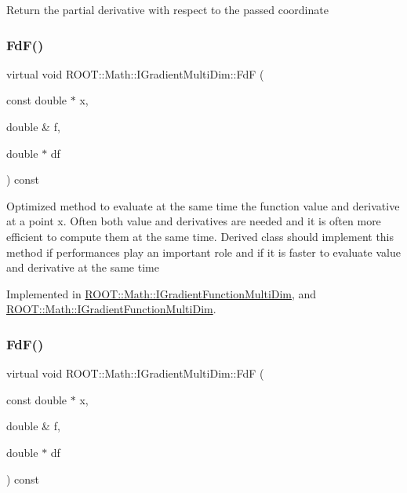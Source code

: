 Return the partial derivative with respect to the passed coordinate \mbox{\label{classROOT_1_1Math_1_1IGradientMultiDim_ad8d0e31b786327014524483a708d8f82}} 
\subsubsection{\texorpdfstring{FdF()}{FdF()}\hspace{0.1cm}{\footnotesize\ttfamily [1/2]}}
{\footnotesize\ttfamily virtual void R\+O\+O\+T\+::\+Math\+::\+I\+Gradient\+Multi\+Dim\+::\+FdF (\begin{DoxyParamCaption}\item[{const double $\ast$}]{x,  }\item[{double \&}]{f,  }\item[{double $\ast$}]{df }\end{DoxyParamCaption}) const\hspace{0.3cm}{\ttfamily [pure virtual]}}

Optimized method to evaluate at the same time the function value and derivative at a point x. Often both value and derivatives are needed and it is often more efficient to compute them at the same time. Derived class should implement this method if performances play an important role and if it is faster to evaluate value and derivative at the same time 

Implemented in \mbox{\hyperlink{classROOT_1_1Math_1_1IGradientFunctionMultiDim_a58cefd2806ec7b9d389911800ed60386}{R\+O\+O\+T\+::\+Math\+::\+I\+Gradient\+Function\+Multi\+Dim}}, and \mbox{\hyperlink{classROOT_1_1Math_1_1IGradientFunctionMultiDim_a58cefd2806ec7b9d389911800ed60386}{R\+O\+O\+T\+::\+Math\+::\+I\+Gradient\+Function\+Multi\+Dim}}.

\mbox{\label{classROOT_1_1Math_1_1IGradientMultiDim_ad8d0e31b786327014524483a708d8f82}} 
\subsubsection{\texorpdfstring{FdF()}{FdF()}\hspace{0.1cm}{\footnotesize\ttfamily [2/2]}}
{\footnotesize\ttfamily virtual void R\+O\+O\+T\+::\+Math\+::\+I\+Gradient\+Multi\+Dim\+::\+FdF (\begin{DoxyParamCaption}\item[{const double $\ast$}]{x,  }\item[{double \&}]{f,  }\item[{double $\ast$}]{df }\end{DoxyParamCaption}) const\hspace{0.3cm}{\ttfamily [pure virtual]}}

